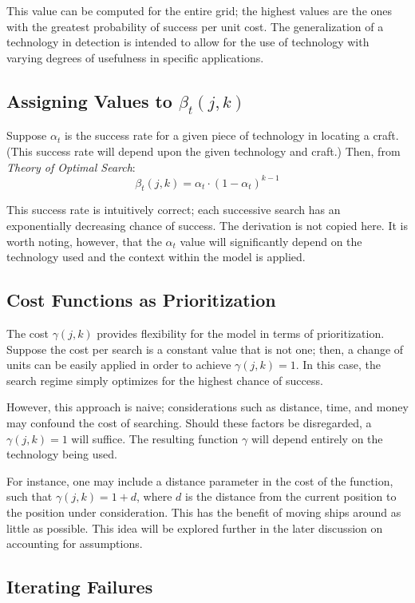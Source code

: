 \documentclass[a4paper,twocolumns]{article}
\begin{document}
\begin{multicols}{2}
This value can be computed for the entire grid; the highest values are the ones with the greatest probability of success per unit cost. The generalization of a technology in detection is intended to allow for the use of technology with varying degrees of usefulness in specific applications.

\subsection{Assigning Values to $\beta_t(j,k)$}

Suppose $\alpha_t$ is the success rate for a given piece of technology in locating a craft. (This success rate will depend upon the given technology and craft.) Then, from \textit{Theory of Optimal Search}: \[\beta_t(j,k)=\alpha_t\cdot(1-\alpha_t)^{k-1}\]

This success rate is intuitively correct; each successive search has an exponentially decreasing chance of success. The derivation is not copied here. It is worth noting, however, that the $\alpha_t$ value will significantly depend on the technology used and the context within the model is applied.

\subsection{Cost Functions as Prioritization}

The cost $\gamma(j,k)$ provides flexibility for the model in terms of prioritization. Suppose the cost per search is a constant value that is not one; then, a change of units can be easily applied in order to achieve $\gamma(j,k)=1$. In this case, the search regime simply optimizes for the highest chance of success. 

However, this approach is naive; considerations such as distance, time, and money may confound the cost of searching. Should these factors be disregarded, a $\gamma(j,k)=1$ will suffice. The resulting function $\gamma$ will depend entirely on the technology being used. 

For instance, one may include a distance parameter in the cost of the function, such that $\gamma(j,k)=1+d$, where $d$ is the distance from the current position to the position under consideration. This has the benefit of moving ships around as little as possible. This idea will be explored further in the later discussion on accounting for assumptions. 

\subsection{Iterating Failures}


\end{multicols}
\end{document}
